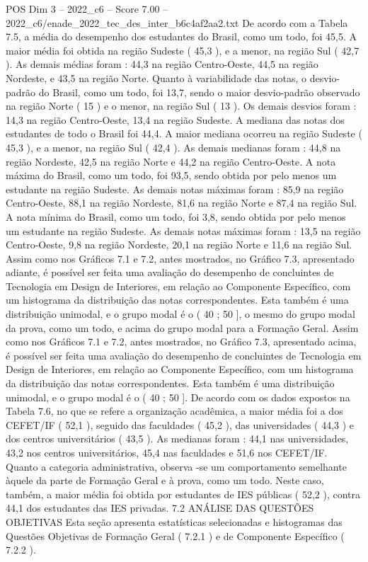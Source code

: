 \begin{textsample}{POS Dim 3 – 2022\_c6 – Score 7.00 – 2022\_c6/enade\_2022\_tec\_des\_inter\_b6c4af2aa2.txt}
De acordo com a Tabela 7.5, a média do desempenho dos estudantes do Brasil, como um todo, foi 45,5.
A maior média foi obtida na região Sudeste ( 45,3 ), e a menor, na região Sul ( 42,7 ).
As demais médias foram : 44,3 na região Centro-Oeste, 44,5 na região Nordeste, e 43,5 na região Norte.
Quanto à variabilidade das notas, o desvio-padrão do Brasil, como um todo, foi 13,7, sendo o maior desvio-padrão observado na região Norte ( 15 ) e o menor, na região Sul ( 13 ).
Os demais desvios foram : 14,3 na região Centro-Oeste, 13,4 na região Sudeste.
A mediana das notas dos estudantes de todo o Brasil foi 44,4.
A maior mediana ocorreu na região Sudeste ( 45,3 ), e a menor, na região Sul ( 42,4 ).
As demais medianas foram : 44,8 na região Nordeste, 42,5 na região Norte e 44,2 na região Centro-Oeste.
A nota máxima do Brasil, como um todo, foi 93,5, sendo obtida por pelo menos um estudante na região Sudeste.
As demais notas máximas foram : 85,9 na região Centro-Oeste, 88,1 na região Nordeste, 81,6 na região Norte e 87,4 na região Sul.
A nota mínima do Brasil, como um todo, foi 3,8, sendo obtida por pelo menos um estudante na região Sudeste.
As demais notas máximas foram : 13,5 na região Centro-Oeste, 9,8 na região Nordeste, 20,1 na região Norte e 11,6 na região Sul.
Assim como nos Gráficos 7.1 e 7.2, antes mostrados, no Gráfico 7.3, apresentado adiante, é possível ser feita uma avaliação do desempenho de concluintes de Tecnologia em Design de Interiores, em relação ao Componente Específico, com um histograma da distribuição das notas correspondentes.
Esta também é uma distribuição unimodal, e o grupo modal é o ( 40 ; 50 ], o mesmo do grupo modal da prova, como um todo, e acima do grupo modal para a Formação Geral.
Assim como nos Gráficos 7.1 e 7.2, antes mostrados, no Gráfico 7.3, apresentado acima, é possível ser feita uma avaliação do desempenho de concluintes de Tecnologia em Design de Interiores, em relação ao Componente Específico, com um histograma da distribuição das notas correspondentes.
Esta também é uma distribuição unimodal, e o grupo modal é o ( 40 ; 50 ].
De acordo com os dados expostos na Tabela 7.6, no que se refere a organização acadêmica, a maior média foi a dos CEFET/IF ( 52,1 ), seguido das faculdades ( 45,2 ), das universidades ( 44,3 ) e dos centros universitários ( 43,5 ).
As medianas foram : 44,1 nas universidades, 43,2 nos centros universitários, 45,4 nas faculdades e 51,6 nos CEFET/IF.
Quanto a categoria administrativa, observa -se um comportamento semelhante àquele da parte de Formação Geral e à prova, como um todo.
Neste caso, também, a maior média foi obtida por estudantes de IES públicas ( 52,2 ), contra 44,1 dos estudantes das IES privadas. 7.2 ANÁLISE DAS QUESTÕES OBJETIVAS Esta seção apresenta estatísticas selecionadas e histogramas das Questões Objetivas de Formação Geral ( 7.2.1 ) e de Componente Específico ( 7.2.2 ).

\end{textsample}
